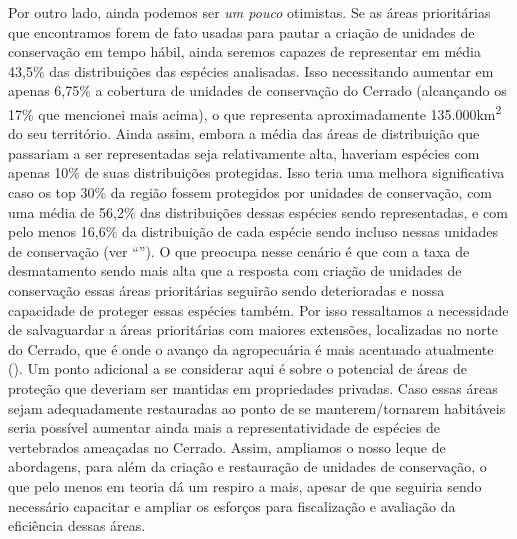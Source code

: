 \documentclass[12pt,openright,oneside,a4paper,english]{abntex2}
\begin{document}
Por outro lado, ainda podemos ser \textit{um pouco} otimistas. Se as áreas prioritárias que encontramos forem de fato usadas para pautar a criação de unidades de conservação em tempo hábil, ainda seremos capazes de representar em média 43,5\% das distribuições das espécies analisadas. Isso necessitando aumentar em apenas 6,75\% a cobertura de unidades de conservação do Cerrado (alcançando os 17\% que mencionei mais acima), o que representa aproximadamente 135.000km\textsuperscript{2} do seu território. Ainda assim, embora a média das áreas de distribuição que passariam a ser representadas seja relativamente alta, haveriam espécies com apenas 10\% de suas distribuições protegidas. Isso teria uma melhora significativa caso os top 30\% da região fossem protegidos por unidades de conservação, com uma média de 56,2\% das distribuições dessas espécies sendo representadas, e com pelo menos 16,6\% da distribuição de cada espécie sendo incluso nessas unidades de conservação (ver “\textit{}”). O que preocupa nesse cenário é que com a taxa de desmatamento sendo mais alta que a resposta com criação de unidades de conservação essas áreas prioritárias seguirão sendo deterioradas e nossa capacidade de proteger essas espécies também. Por isso ressaltamos a necessidade de salvaguardar a áreas prioritárias com maiores extensões, localizadas no norte do Cerrado, que é onde o avanço da agropecuária é mais acentuado atualmente (\citealp[ver][]{Pacheco2021}). Um ponto adicional a se considerar aqui é sobre o potencial de áreas de proteção que deveriam ser mantidas em propriedades privadas. Caso essas áreas sejam adequadamente restauradas ao ponto de se manterem/tornarem habitáveis seria possível aumentar ainda mais a representatividade de espécies de vertebrados ameaçadas no Cerrado. Assim, ampliamos o nosso leque de abordagens, para além da criação e restauração de unidades de conservação, o que pelo menos em teoria dá um respiro a mais, apesar de que seguiria sendo necessário capacitar e ampliar os esforços para fiscalização e avaliação da eficiência dessas áreas.
\end{document}
